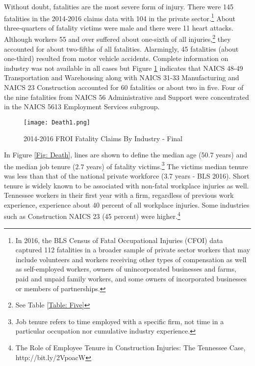 \documentclass[9pt, oneside]{article}   	%
\begin{document}
Without doubt, fatalities are the most severe form of injury. There were 145 fatalities in the 2014-2016 claims data with 104 in the private sector.\footnote{In 2016, the BLS Census of Fatal Occupational Injuries (CFOI) data captured 112 fatalities in a broader sample of private sector workers that may include volunteers and workers receiving other types of compensation as well as self-employed workers, owners of unincorporated businesses and farms, paid and unpaid family workers, and some owners of incorporated businesses or members of partnerships.} About three-quarters of fatality victims were male and there were 11 heart attacks. Although workers 55 and over suffered about one-sixth of all injuries,\footnote{See Table \ref{Table: Five}} they accounted for about two-fifths of all fatalities. Alarmingly, 45 fatalities (about one-third) resulted from motor vehicle accidents. 
Complete information on industry was not available in all cases but Figure \ref{Fig:Death1} indicates that NAICS 48-49 Transportation and Warehousing along with NAICS 31-33 Manufacturing and NAICS 23 Construction accounted for 60 fatalities or about two in five.  Four of the nine fatalities from NAICS 56 Administrative and Support were concentrated in the NAICS 5613 Employment Services subgroup.




\begin{figure}[htp]
\caption{2014-2016 FROI Fatality Claims By Industry - Final}
\hspace{0.1in}

\label{Fig:Death1}
\begin{center}
\texttt{[image: Death1.png]}
\end{center}
\end{figure}

\pagebreak

In Figure \ref{Fig: Death}, lines are shown to define the median age (50.7 years) and the median job tenure (2.7 years) of fatality victims.\footnote{Job tenure refers to time employed with a specific firm, not time in a particular occupation nor cumulative industry experience.} The victims median tenure was less than that of the national private workforce (3.7 years - BLS 2016). Short tenure is widely known to be associated with non-fatal workplace injuries as well. Tennessee workers in their first year with a firm, regardless of previous work experience, experience about 40 percent of all workplace injuries. Some industries such as Construction NAICS 23 (45 percent) were higher.\footnote{The Role of Employee Tenure in Construction Injuries: The Tennessee Case, 
http://bit.ly/2VpoacW}
\end{document}
